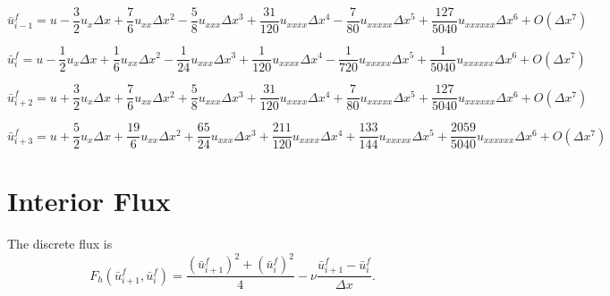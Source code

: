 \documentclass[10pt]{article}%
\begin{document}
\[
\bar u_{i-1}^f =  u
  - \frac{3}{2} u_x            \Delta x
  + \frac{7}{6} u_{xx}         \Delta x^2 
  - \frac{5}{8} u_{xxx}       \Delta x^3 
  + \frac{31}{120} u_{xxxx}     \Delta x^4 
  - \frac{7}{80} u_{xxxxx}   \Delta x^5 
  + \frac{127}{5040} u_{xxxxxx}   \Delta x^6 
  + O(\Delta x^7) 
\]

\[
\bar u_{i}^f =  u
  - \frac{1}{2} u_x             \Delta x
  + \frac{1}{6} u_{xx}          \Delta x^2 
  - \frac{1}{24} u_{xxx}        \Delta x^3 
  + \frac{1}{120} u_{xxxx}      \Delta x^4 
  - \frac{1}{720} u_{xxxxx}    \Delta x^5 
  + \frac{1}{5040} u_{xxxxxx}   \Delta x^6 
  + O(\Delta x^7) 
\]


\[
\bar u_{i+2}^f =  u
  + \frac{3}{2} u_x             \Delta x
  + \frac{7}{6} u_{xx}          \Delta x^2 
  + \frac{5}{8} u_{xxx}         \Delta x^3 
  + \frac{31}{120} u_{xxxx}     \Delta x^4 
  + \frac{7}{80} u_{xxxxx}     \Delta x^5 
  + \frac{127}{5040} u_{xxxxxx} \Delta x^6 
  + O(\Delta x^7) 
\]

\[
\bar u_{i+3}^f =  u
  + \frac{5}{2} u_x                \Delta x
  + \frac{19}{6} u_{xx}            \Delta x^2 
  + \frac{65}{24} u_{xxx}          \Delta x^3 
  + \frac{211}{120}   u_{xxxx}     \Delta x^4 
  + \frac{133}{144}     u_{xxxxx} \Delta x^5 
  + \frac{2059}{5040} u_{xxxxxx}   \Delta x^6 
  + O(\Delta x^7) 
\]



%
%

\section{Interior Flux}
The discrete flux is
\[
  F_h(\bar u^f_{i+1}, \bar u^f_{i}) = \frac{(\bar u^f_{i+1})^2+(\bar u^f_{i})^2}{4} - \nu \frac{\bar u^f_{i+1}-\bar u^f_{i}}{\Delta x}.
\]
\end{document}
